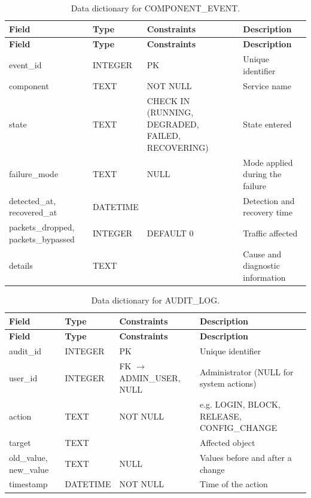 {\small
\begin{longtable}{|>{\raggedright\arraybackslash}p{}|>{\raggedright\arraybackslash}p{}|>{\raggedright\arraybackslash}p{}|>{\raggedright\arraybackslash}p{}|}
\caption{Data dictionary for COMPONENT\_EVENT.}\label{tab:4.27}\\
\hline
\textbf{Field} & \textbf{Type} & \textbf{Constraints} & \textbf{Description} \\ \hline
\endfirsthead
\hline
\textbf{Field} & \textbf{Type} & \textbf{Constraints} & \textbf{Description} \\ \hline
\endhead
event\_id & INTEGER & PK & Unique identifier \\ \hline
component & TEXT & NOT NULL & Service name \\ \hline
state & TEXT & CHECK IN (RUNNING, DEGRADED, FAILED, RECOVERING) & State entered \\ \hline
failure\_mode & TEXT & NULL & Mode applied during the failure \\ \hline
detected\_at, recovered\_at & DATETIME &  & Detection and recovery time \\ \hline
packets\_dropped, packets\_bypassed & INTEGER & DEFAULT 0 & Traffic affected \\ \hline
details & TEXT &  & Cause and diagnostic information \\ \hline
\end{longtable}
}

{\small
\begin{longtable}{|>{\raggedright\arraybackslash}p{}|>{\raggedright\arraybackslash}p{}|>{\raggedright\arraybackslash}p{}|>{\raggedright\arraybackslash}p{}|}
\caption{Data dictionary for AUDIT\_LOG.}\label{tab:4.28}\\
\hline
\textbf{Field} & \textbf{Type} & \textbf{Constraints} & \textbf{Description} \\ \hline
\endfirsthead
\hline
\textbf{Field} & \textbf{Type} & \textbf{Constraints} & \textbf{Description} \\ \hline
\endhead
audit\_id & INTEGER & PK & Unique identifier \\ \hline
user\_id & INTEGER & FK $\rightarrow$ ADMIN\_USER, NULL & Administrator (NULL for system actions) \\ \hline
action & TEXT & NOT NULL & e.g. LOGIN, BLOCK, RELEASE, CONFIG\_CHANGE \\ \hline
target & TEXT &  & Affected object \\ \hline
old\_value, new\_value & TEXT & NULL & Values before and after a change \\ \hline
timestamp & DATETIME & NOT NULL & Time of the action \\ \hline
\end{longtable}
}

